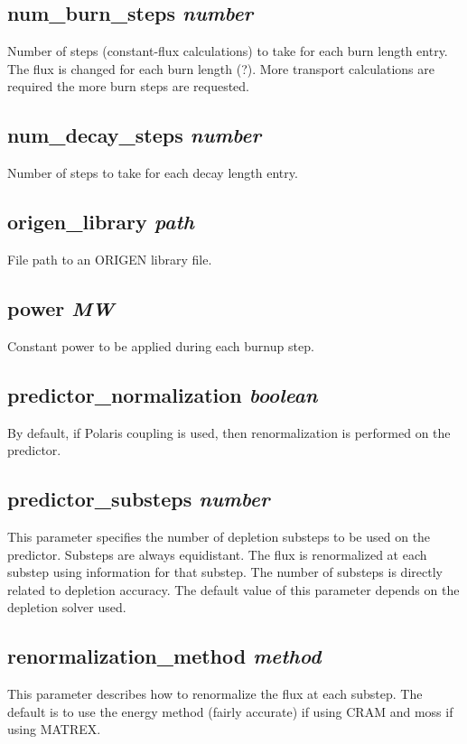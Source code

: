 \documentclass[10pt]{article}
\begin{document}
\subsection{num\_burn\_steps \textit{number}}
Number of steps (constant-flux calculations) to take for each burn length entry. The flux is changed for each burn length (?). More transport calculations are required the more burn steps are requested.

\subsection{num\_decay\_steps \textit{number}}
Number of steps to take for each decay length entry. 

\subsection{origen\_library \textit{path}}
File path to an ORIGEN library file.

\subsection{power \textit{MW}}
Constant power to be applied during each burnup step. 

\subsection{predictor\_normalization \textit{boolean}}
By default, if Polaris coupling is used, then renormalization is performed on the predictor.

\subsection{predictor\_substeps \textit{number}}
This parameter specifies the number of depletion substeps to be used on the predictor. Substeps are always equidistant. The flux is renormalized at each substep using information for that substep. The number of substeps is directly related to depletion accuracy. The default value of this parameter depends on the depletion solver used.

\subsection{renormalization\_method \textit{method}}
This parameter describes how to renormalize the flux at each substep. The default is to use the energy method (fairly accurate) if using CRAM and moss if using MATREX.
\end{document}
